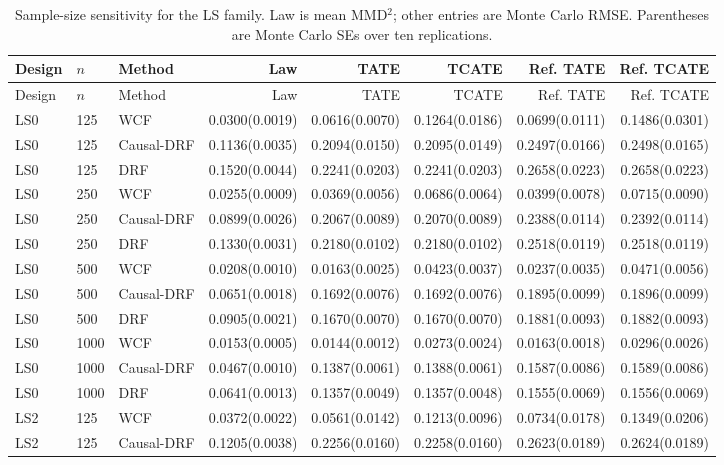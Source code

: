 \begingroup
\tiny
\setlength{\tabcolsep}{1.5pt}
\begin{longtable}{lllrrrrr}
\caption{Sample-size sensitivity for the LS family. Law is mean MMD$^2$; other entries are Monte Carlo RMSE. Parentheses are Monte Carlo SEs over ten replications.}\label{tab:sample-size-ls}\\
\toprule
Design & $n$ & Method & Law & TATE & TCATE & Ref. TATE & Ref. TCATE \\
\midrule
\endfirsthead
\toprule
Design & $n$ & Method & Law & TATE & TCATE & Ref. TATE & Ref. TCATE \\
\midrule
\endhead
LS0 & 125 & WCF & 0.0300(0.0019) & 0.0616(0.0070) & 0.1264(0.0186) & 0.0699(0.0111) & 0.1486(0.0301) \\
LS0 & 125 & Causal-DRF & 0.1136(0.0035) & 0.2094(0.0150) & 0.2095(0.0149) & 0.2497(0.0166) & 0.2498(0.0165) \\
LS0 & 125 & DRF & 0.1520(0.0044) & 0.2241(0.0203) & 0.2241(0.0203) & 0.2658(0.0223) & 0.2658(0.0223) \\
\addlinespace
LS0 & 250 & WCF & 0.0255(0.0009) & 0.0369(0.0056) & 0.0686(0.0064) & 0.0399(0.0078) & 0.0715(0.0090) \\
LS0 & 250 & Causal-DRF & 0.0899(0.0026) & 0.2067(0.0089) & 0.2070(0.0089) & 0.2388(0.0114) & 0.2392(0.0114) \\
LS0 & 250 & DRF & 0.1330(0.0031) & 0.2180(0.0102) & 0.2180(0.0102) & 0.2518(0.0119) & 0.2518(0.0119) \\
\addlinespace
LS0 & 500 & WCF & 0.0208(0.0010) & 0.0163(0.0025) & 0.0423(0.0037) & 0.0237(0.0035) & 0.0471(0.0056) \\
LS0 & 500 & Causal-DRF & 0.0651(0.0018) & 0.1692(0.0076) & 0.1692(0.0076) & 0.1895(0.0099) & 0.1896(0.0099) \\
LS0 & 500 & DRF & 0.0905(0.0021) & 0.1670(0.0070) & 0.1670(0.0070) & 0.1881(0.0093) & 0.1882(0.0093) \\
\addlinespace
LS0 & 1000 & WCF & 0.0153(0.0005) & 0.0144(0.0012) & 0.0273(0.0024) & 0.0163(0.0018) & 0.0296(0.0026) \\
LS0 & 1000 & Causal-DRF & 0.0467(0.0010) & 0.1387(0.0061) & 0.1388(0.0061) & 0.1587(0.0086) & 0.1589(0.0086) \\
LS0 & 1000 & DRF & 0.0641(0.0013) & 0.1357(0.0049) & 0.1357(0.0048) & 0.1555(0.0069) & 0.1556(0.0069) \\
\addlinespace
\midrule
LS2 & 125 & WCF & 0.0372(0.0022) & 0.0561(0.0142) & 0.1213(0.0096) & 0.0734(0.0178) & 0.1349(0.0206) \\
LS2 & 125 & Causal-DRF & 0.1205(0.0038) & 0.2256(0.0160) & 0.2258(0.0160) & 0.2623(0.0189) & 0.2624(0.0189) \\

\end{longtable}
